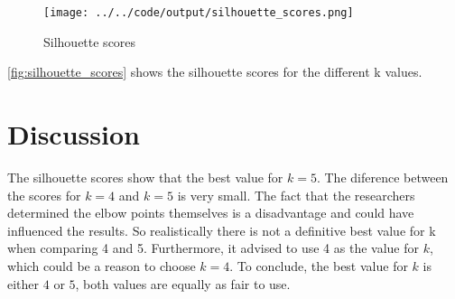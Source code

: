 \documentclass[twoside, a4paper, fleqn, reqno]{article}
\begin{document}
\begin {figure}[H]
	\centering
	\texttt{[image: ../../code/output/silhouette\_scores.png]}
	\caption{Silhouette scores}
	\label{fig:silhouette_scores}
\end {figure}

\autoref{fig:silhouette_scores} shows the silhouette scores for the different k values.

\section{Discussion}

The silhouette scores show that the best value for $k=5$. The diference between the scores for
$k=4$ and $k=5$ is very small.
The fact that the researchers determined the elbow points themselves is a disadvantage
and could have influenced the results.
So realistically there is not a definitive best value for k when comparing 4 and 5.
Furthermore, it advised to use 4 as the value for $k$, which could be a reason to choose $k=4$.
To conclude, the best value for $k$ is either $4$ or $5$, both values are equally as fair to use. 
\end{document}
